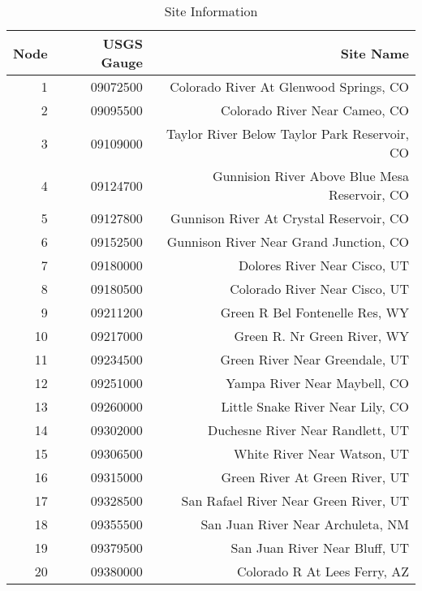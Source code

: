 \documentclass[11pt]{article}
\begin{document}
\begin{table}[ht]
\begin{center}
\begin{tabular}{rrr}
  \toprule
 Node & USGS Gauge & Site Name \\ 
  \midrule
  1  & 09072500 &  Colorado River At Glenwood Springs, CO        \\ 
  2  & 09095500 &  Colorado River Near Cameo, CO                 \\ 
  3  & 09109000 &  Taylor River Below Taylor Park Reservoir, CO  \\ 
  4  & 09124700 &  Gunnision River Above Blue Mesa Reservoir, CO \\ 
  5  & 09127800 &  Gunnison River At Crystal Reservoir, CO       \\ 
  6  & 09152500 &  Gunnison River Near Grand Junction, CO        \\ 
  7  & 09180000 &  Dolores River Near Cisco, UT                  \\ 
  8  & 09180500 &  Colorado River Near Cisco, UT                 \\ 
  9  & 09211200 &  Green R Bel Fontenelle Res, WY                \\ 
  10 & 09217000 &  Green R. Nr Green River, WY                   \\ 
  11 & 09234500 &  Green River Near Greendale, UT                \\ 
  12 & 09251000 &  Yampa River Near Maybell, CO                  \\ 
  13 & 09260000 &  Little Snake River Near Lily, CO              \\ 
  14 & 09302000 &  Duchesne River Near Randlett, UT              \\ 
  15 & 09306500 &  White River Near Watson, UT                   \\ 
  16 & 09315000 &  Green River At Green River, UT                \\ 
  17 & 09328500 &  San Rafael River Near Green River, UT         \\ 
  18 & 09355500 &  San Juan River Near Archuleta, NM             \\ 
  19 & 09379500 &  San Juan River Near Bluff, UT                 \\ 
  20 & 09380000 &  Colorado R At Lees Ferry, AZ                  \\ 
   \bottomrule
\end{tabular}
\caption{Site Information}
\end{center}
\end{table}
\end{document}
